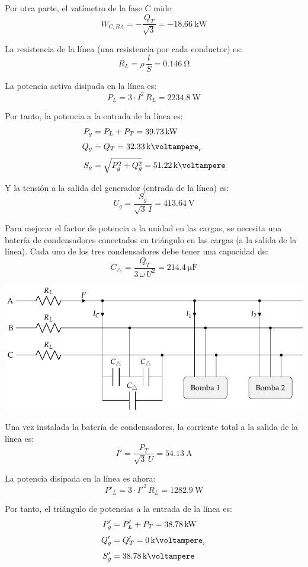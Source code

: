 Por otra parte, el vatímetro de la fase C mide:
\[
  W_{C, BA} = - \frac{Q_T}{\sqrt{3}} = - \SI{18.66}{\kilo\watt}
\]

La resistencia de la línea (una resistencia por cada conductor) es:
\[
R_L = \rho \, \frac{l}{S} = \SI{0.146}{\ohm}
\]

La potencia activa disipada en la línea es:
\[
P_L = 3 \cdot I^2 \, R_L = \SI{2234.8}{\watt}
\]

Por tanto, la potencia a la entrada de la línea es:
\begin{align*}
    P_g &= P_L + P_T = \SI{39.73}{\kilo\watt}\\[3pt]
    Q_g &= Q_T = \SI{32.33}{\kilo\voltampere}_r\\[3pt]
    S_g &= \sqrt{P_g^2 + Q_g^2} = \SI{51.22}{\kilo\voltampere}
\end{align*}

\vspace{2mm}
Y la tensión a la salida del generador (entrada de la línea) es:
\[
U_g = \frac{S_g}{\sqrt{3} \, I} = \SI{413.64}{\volt}
\]

Para mejorar el factor de potencia a la unidad en las cargas, se necesita una batería de condensadores conectados en triángulo en las cargas (a la salida de la línea). Cada uno de los tres condensadores debe tener una capacidad de:
\[
C_{\triangle} = \frac{Q_T}{3 \, \omega \, U^2} = \SI{214.4}{\micro\farad}
\]

\begin{center}
    \includegraphics[width=.9\textwidth]{figuras/BT3_ej5_bombas_condensadores.pdf}
\end{center}

Una vez instalada la batería de condensadores, la corriente total a la salida de la línea es:
\[
I' = \frac{P_T}{\sqrt{3} \, U} = \SI{54.13}{\ampere}
\]

La potencia disipada en la línea es ahora:
\[
P'_L = 3 \cdot I'^2 \, R_L = \SI{1282.9}{\watt} 
\]

Por tanto, el triángulo de potencias a la entrada de la línea es:
\begin{align*}
P'_g &= P'_L + P_T = \SI{38.78}{\kilo\watt}\\[3pt]
Q'_g &= Q'_T = \SI{0}{\kilo\voltampere}_r\\[3pt]
S'_g &= \SI{38.78}{\kilo\voltampere}
\end{align*}

